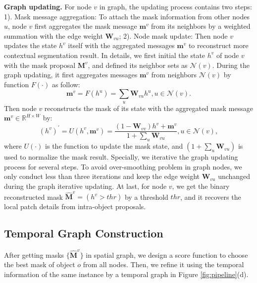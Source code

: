 \documentclass[letterpaper]{article} \usepackage{aaai21}  \usepackage{times}  \usepackage{helvet} \usepackage{courier}  \usepackage[hyphens]{url}  \usepackage{graphicx} \urlstyle{rm} \def\UrlFont{\rm}  \usepackage{graphicx}  \usepackage{natbib}  \usepackage{caption} \frenchspacing  \setlength{\pdfpagewidth}{8.5in}  \setlength{\pdfpageheight}{11in}  \usepackage{amsmath}
\begin{document}
\noindent \textbf{Graph updating.}
For node $v$ in graph, the updating process contains two steps: 1). Mask message aggregation: To attach the mask information from other nodes $u$, node $v$ first aggregates the mask message $\bm{m}^v$ from its neighbors by a weighted summation with the edge weight $\bm{W}_{vu}$; 2). Node mask update: Then node $v$ updates the state $h^v$ itself with the aggregated messages $\bm{m}^v$ to reconstruct more contextual segmentation result.
In details, we first initial the state $h^v$ of node $v$ with the mask proposal $\bm{M}^{v}$, and defined its neighbor sets as $\mathcal{N}(v)$. During the graph updating, it first aggregates messages $\bm{m}^v$ from neighbors $\mathcal{N}(v)$ by function $F(\cdot)$ as follow:
\begin{equation}
    \bm{m}^v = F(h^u) = \sum_u \bm{W}_{vu}h^u, u\in \mathcal{N}(v).
\end{equation}
Then node $v$ reconstructs the mask of its state with the aggregated mask message $\bm{m}^v \in \mathbb{R}^{H\times W}$ by:
\begin{equation}
    (h^v)^{'} = U(h^{v}, \bm{m}^v) = \frac{(1-\bm{W}_{vv})h^{v}+\bm{m}^v}{1+\sum_u \bm{W}_{vu}} , u\in \mathcal{N}(v),
\end{equation}
where $U(\cdot)$ is the function to update the mask state, and $(1+\sum_{u}\bm{W}_{vu})$ is used to normalize the mask result.
Specially, we iterative the graph updating process for several steps.
To avoid over-smoothing problem \cite{li2018deeper} in graph nodes, we only conduct less than three iterations and keep the edge weight $\bm{W}_{vu}$ unchanged during the graph iterative updating. 
At last, for node $v$, we get the binary reconstructed mask $\widehat{\bm{M}}^{v} = (h^v>thr)$ by a threshold $thr$, and it recovers the local patch details from intra-object proposals.

\subsection{Temporal Graph Construction}
After getting masks $\{\widehat{\bm{M}}^{v}\}$ in spatial graph, we design a score function to choose the best mask of object $o$ from all nodes. Then, we refine it using the temporal information of the same instance by a temporal graph in Figure \ref{fig:pipeline}(d).
\end{document}
